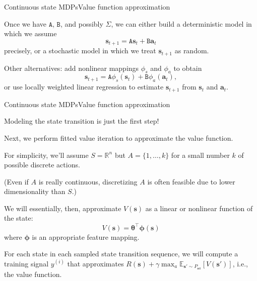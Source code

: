 \documentclass{beamer}
\renewcommand{\vec}[1]{\boldsymbol{#1}}
\newcommand{\mat}[1]{\mathtt{#1}}
\def\Rset{\mathbb{R}}
\def\Expec{\mathbb{E}}
\begin{document}
\begin{frame}{Continuous state MDPs}{Value function approximation}

  Once we have $\mat{A}$, $\mat{B}$, and possibly $\Sigma$, we
  can either build a \alert{deterministic} model in which we assume
  \[ \vec{s}_{t+1} = \mat{A}\vec{s}_t + \mat{B}\vec{a}_t \]
  precisely, or a \alert{stochastic} model in which we treat
  $\vec{s}_{t+1}$ as random.

  \medskip

  Other alternatives: add nonlinear mappings $\phi_s$ and $\phi_a$ to obtain
  \[ \vec{s}_{t+1} = \mat{A}\phi_s(\vec{s}_t) + \mat{B}\phi_a(\vec{a}_t), \]
  or use locally weighted linear regression to estimate $\vec{s}_{t+1}$ from
    $\vec{s}_t$ and $\vec{a}_t$.
  
\end{frame}


\begin{frame}{Continuous state MDPs}{Value function approximation}

  Modeling the state transition is just the first step!

  \medskip

  Next, we perform \alert{fitted value iteration} to approximate the
  value function.

  \medskip

  For simplicity, we'll assume $S = \Rset^n$ but $A = \{ 1, \ldots, k \}$ for
  a small number $k$ of possible discrete actions.

  \medskip

  (Even if $A$ is really continuous, discretizing $A$ is often
  feasible due to lower dimensionality than $S$.)

  \medskip

  We will essentially, then, approximate $V(\vec{s})$ as a linear or
  nonlinear function of the state:
  \[ V(\vec{s}) = \vec{\theta}^\top\vec{\phi}(\vec{s}) \]
  where $\vec{\phi}$ is an appropriate feature mapping.

  \medskip

  For each state in each sampled state transition sequence, we will
  compute a training signal $y^{(i)}$ that approximates $R(\vec{s}) +
  \gamma \max_a\Expec_{\vec{s}'\sim P_{\vec{s}a}}[V(\vec{s}')]$, i.e.,
  the value function.
  
\end{frame}
\end{document}
